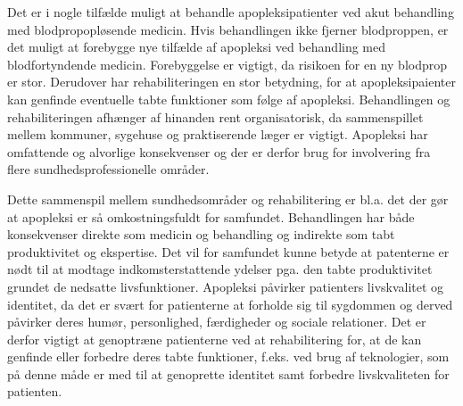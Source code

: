 Det er i nogle tilfælde muligt at behandle apopleksipatienter ved akut behandling med blodpropopløsende medicin. Hvis behandlingen ikke fjerner blodproppen, er det muligt at forebygge nye tilfælde af apopleksi ved behandling med blodfortyndende medicin.\cite{Hjerteforeningen2014} \cite{Kruuse2014a} Forebyggelse er vigtigt, da risikoen for en ny blodprop er stor. Derudover har rehabiliteringen en stor betydning, for at apopleksipaienter kan genfinde eventuelle tabte funktioner som følge af apopleksi.\cite{Kjaergaard2015} Behandlingen og rehabiliteringen afhænger af hinanden rent organisatorisk, da sammenspillet mellem kommuner, sygehuse og praktiserende læger er vigtigt. Apopleksi har omfattende og alvorlige konsekvenser og der er derfor brug for involvering fra flere sundhedsprofessionelle områder.\cite{Sundhedsstyrelsen2010}

Dette sammenspil mellem sundhedsområder og rehabilitering er bl.a. det der gør at apopleksi er så omkostningsfuldt for samfundet. Behandlingen har både konsekvenser direkte som medicin og behandling og indirekte som tabt produktivitet og ekspertise. Det vil for samfundet kunne betyde at patenterne er nødt til at modtage indkomsterstattende ydelser pga. den tabte produktivitet grundet de nedsatte livsfunktioner.\cite{Sundhedsstyrelsen2010} 
Apopleksi påvirker patienters livskvalitet og identitet, da det er svært for patienterne at forholde sig til sygdommen og derved påvirker deres humør, personlighed, færdigheder og sociale relationer. Det er derfor vigtigt at genoptræne patienterne ved at rehabilitering for, at de kan genfinde eller forbedre deres tabte funktioner, f.eks. ved brug af teknologier, som på denne måde er med til at genoprette identitet samt forbedre livskvaliteten for patienten.\cite{Sundhedsstyrelsen2010}  

